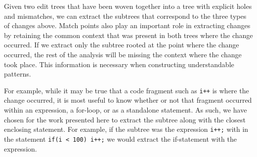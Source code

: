 


Given two edit trees that have been woven together into a tree with explicit
holes and mismatches, we can extract the subtrees that correspond to the three
types of changes above.  Match points also play an important role in
extracting changes by retaining the common context that was present in both
trees where the change occurred.  If we extract only the subtree rooted at the
point where the change occurred, the rest of the analysis will be missing the
context where the change took place. This information is necessary when
constructing understandable patterns.  

For example, while it may be true that a code fragment such as {\tt i++} is
where the change occurred, it is most useful to know whether or not that
fragment occurred within an expression, a for-loop, or as a standalone
statement. As such, we have chosen for the work presented here to extract the
subtree along with the closest enclosing statement. For example, if the
subtree was the expression {\tt i++;} with in the statement {\tt if(i < 100)
i++;} we would extract the if-statement with the expression.

